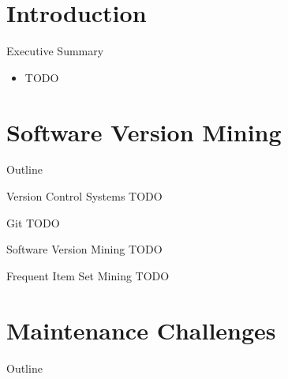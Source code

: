 \section*{Introduction}

\begin{frame}{Executive Summary}
  \begin{itemize}
  \item TODO
  \end{itemize}
\end{frame}



\section{Software Version Mining}


\begin{frame}{Outline}
  \tableofcontents[current]
\end{frame}


\begin{frame}{Version Control Systems}
  TODO
\end{frame}


\begin{frame}{Git}
  TODO
\end{frame}


\begin{frame}{Software Version Mining}
  TODO
\end{frame}


\begin{frame}{Frequent Item Set Mining}
  TODO
\end{frame}



\section{Maintenance Challenges}

\begin{frame}{Outline}
  \tableofcontents[current]
\end{frame}


